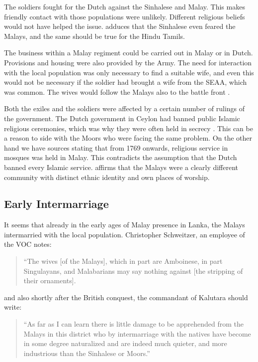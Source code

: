 The soldiers fought for the Dutch against the Sinhalese and Malay. This makes friendly contact with those populations were unlikely.  Different religious beliefs would not have helped the issue. \citet[cf.][51]{Hussainmiya1987} adduces that the Sinhalese even feared the Malays, and the same should be true for the Hindu Tamils.

The business within a Malay regiment could be carried out in Malay or in Dutch. Provisions and housing were also provided by the Army. The need for interaction with the local population was only necessary to find a suitable wife, and even this would not be necessary if the soldier had brought a wife from the SEAA, which was common. The wives would follow the Malays also to the battle front \citet[cf.][50]{Hussainmiya1987}.

Both the exiles and the soldiers were affected by a certain number of rulings of the government. The Dutch government in Ceylon  had banned public Islamic religious ceremonies, which was why they were often held in secrecy  \citep{abc} . This can be a reason to side  with the Moors who were facing the same problem. On  the other hand we have sources stating that from 1769 onwards, religious service in mosques was held in Malay. This contradicts the assumption that the Dutch banned every Islamic service. \kuckn{}
 \citet[11]{Bichsel} affirms that the Malays were a clearly different community with distinct ethnic identity and own places of worship.

\subsection{Early Intermarriage}\label{sec:slmbg:EarlyIntermarriage}
It seems that already in the early ages of Malay presence in Lanka, the Malays intermarried with the local population. Christopher Schweitzer, an employee of the VOC notes:

\begin{quote}
    ``The wives [of the Malays], which in part are Amboinese, in part Singulayans, and Malabarians may say nothing against [the stripping of their ornaments].
\end{quote}

and also shortly after the British conquest, the commandant of Kalutara should write:

\begin{quote}
    ``As far as I can learn there is little damage to be apprehended from the Malays in this district who by intermarriage with the natives have become in some degree naturalized and are indeed much quieter, and more industrious than the Sinhalese or Moors.''\citep[61]{Hussainmiya1990}
\end{quote}

